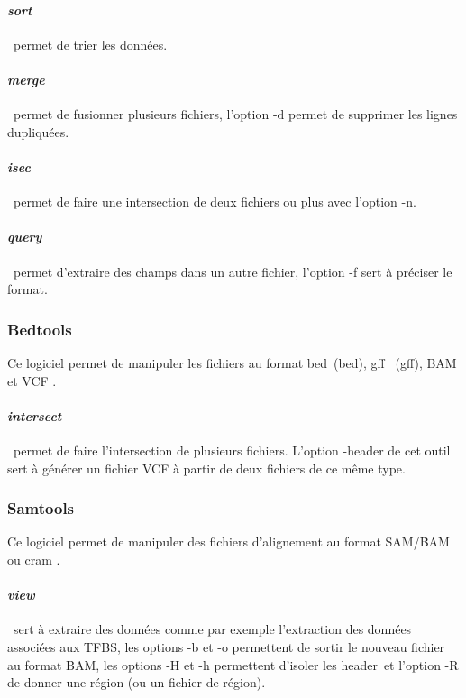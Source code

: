 \paragraph*{\textit{sort}} ~permet de trier les données.
\paragraph*{\textit{merge}} ~permet de fusionner plusieurs fichiers, l'option -d permet de supprimer les lignes dupliquées.
\paragraph*{\textit{isec}} ~permet de faire une intersection de deux fichiers ou plus avec l'option -n.
\paragraph*{\textit{query}} ~permet d'extraire des champs dans un autre fichier, l'option -f sert à préciser le format.

\subsubsection{Bedtools}

Ce logiciel permet de manipuler les fichiers au format \og \acrlong{bed}\fg ~(\acrshort{bed}), \og \acrlong{gff} \fg ~(\acrshort{gff}), BAM et VCF \citep{bedtools}. 
\paragraph*{\textit{intersect}} ~permet de faire l'intersection de plusieurs fichiers. L'option -header de cet outil sert à générer un fichier VCF à partir de deux fichiers de ce même type.

\subsubsection{Samtools} 

Ce logiciel permet de manipuler des fichiers d'alignement au format SAM/BAM ou \acrshort{cram} \citep{Samtools}.
\paragraph*{\textit{view}} ~sert à extraire des données comme par exemple l'extraction des données associées aux TFBS, les options -b et -o permettent de sortir le nouveau fichier au format BAM, les options -H et -h permettent d'isoler les \og header\fg ~et l'option -R de donner une région (ou un fichier de région).
